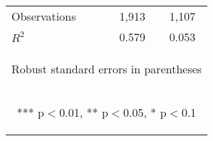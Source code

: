 \documentclass{article} %
\begin{document}
\begin{table}[H]
\begin{center}
\begin{tabular}{lcc}
Observations & 1,913 & 1,107 \\
 $R^2$ & 0.579 & 0.053 \\ \hline
\multicolumn{3}{c}{\begin{footnotesize} Robust standard errors in parentheses\end{footnotesize}} \\
\multicolumn{3}{c}{\begin{footnotesize} *** p$<$0.01, ** p$<$0.05, * p$<$0.1\end{footnotesize}} \\
\end{tabular}
\end{center}

\end{table}

\begin{table}[H]


\end{table}
\end{document}
